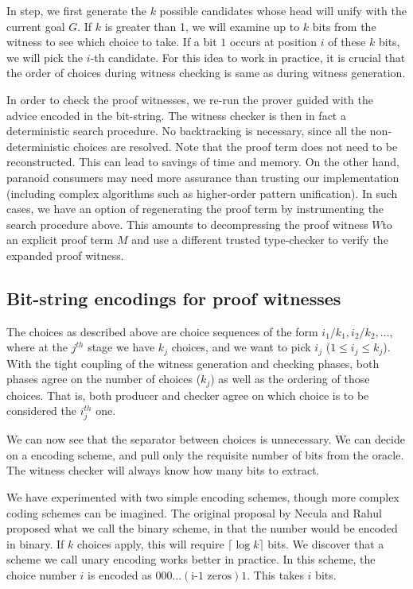 \documentclass{llncs}
\begin{document}
In {} step, we first generate the $k$ possible candidates
whose head will unify with the current goal $G$. If $k$ is greater
than 1, we will examine up to $k$ bits from the witness to see which
choice to take. If a bit $1$ occurs at position $i$ of these $k$
bits, we will pick the $i$-th candidate. For this idea to work in practice, it is crucial that the order of choices during witness checking is same as during witness generation.

In order to check the proof witnesses, we re-run the prover guided
with the advice encoded in the bit-string. The witness checker is then
in fact a deterministic search procedure. No backtracking is
necessary, since all the non-deterministic choices are resolved.  
Note that the proof term does not need to be reconstructed. This can
lead to savings of time and memory. On the other hand, paranoid
consumers may need more assurance than trusting our implementation
(including complex algorithms such as higher-order pattern
unification). In such cases, we have an option of regenerating the
proof term by instrumenting the search procedure above.  This amounts
to decompressing the proof witness $W$to an explicit proof term $M$
and use a different trusted type-checker to verify the expanded proof
witness.

\subsection{Bit-string encodings for proof witnesses}

The choices as described above are choice sequences of the form
$i_1/k_1,i_2/k_2,\ldots$, where at the $j^{th}$ stage we have $k_j$
choices, and we want to pick $i_j$ ($1 \leq i_j \leq k_j$). With the
tight coupling of the witness generation and checking phases, both
phases agree on the number of choices ($k_j$) as well as the ordering
of those choices. That is, both producer and checker agree on which
choice is to be considered the $i_j^{th}$ one.

We can now see that the separator between choices is unnecessary. We
can decide on a encoding scheme, and pull only the requisite number of
bits from the oracle. The witness checker will always know how many
bits to extract.

We have experimented with two simple encoding schemes, though more
complex coding schemes can be imagined. The original proposal by
Necula and Rahul proposed what we call the binary scheme, in that the
number would be encoded in binary. If $k$ choices apply, this will
require $\lceil\log k\rceil$ bits. We discover that a scheme we call
unary encoding works better in practice. In this scheme, the choice
number $i$ is encoded as $0 0 0 \ldots (\mbox{i-1 zeros}) 1$. This
takes $i$ bits.
\end{document}
